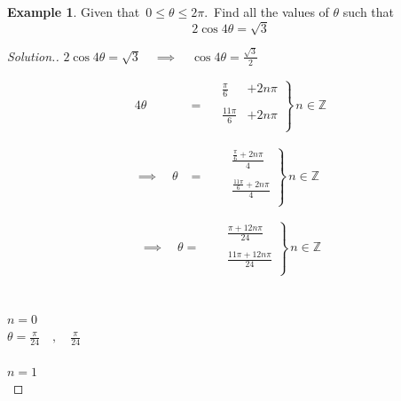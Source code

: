 \documentclass[11pt,a4paper]{article}
\theoremstyle{definition}
\newtheorem{example}[thm]{Example}
\newenvironment{solution}
  {\renewcommand{\qedsymbol}{}\begin{proof}[\textit{Solution}.]}
  {\end{proof}}
\begin{document}
\begin{example}

Given that $\, 0 \leq \theta \leq 2\pi.\,$ Find all the values of $\theta$ such that $$2\cos 4\theta = \sqrt{3}$$
\end{example}
\begin{solution}

$2\cos 4\theta = \sqrt{3}\quad  \implies \quad  \cos 4\theta = \frac{\sqrt{3}}{2}$



\begin{align*}
4\theta & = \quad \left.\begin{aligned}
\frac{\pi}{6} & + 2n\pi\\\\
\frac{11\pi}{6}& + 2n\pi\\
\end{aligned}
\right\}\, n \in \mathbb{Z}\\\\\\
\implies \quad  \theta & = \quad \left.\begin{aligned}
& \frac{\frac{\pi}{6} + 2n\pi}{4}\\\\
& \frac{\frac{11\pi}{6} + 2n\pi}{4}\\
\end{aligned}
\right\}\, n \in \mathbb{Z}
\end{align*}



\[\implies \quad  \theta = \quad \left.\begin{aligned}
& \frac{\pi + 12n\pi}{24}\\\\
& \frac{11\pi + 12n\pi}{24}\\
\end{aligned}
\right\}\, n \in \mathbb{Z}
\]\\\\







$n = 0$\\

$\theta = \frac{\pi}{24}\quad , \quad  \frac{\pi}{24}$\\\\





$n = 1$\\


\end{solution}
\end{document}
